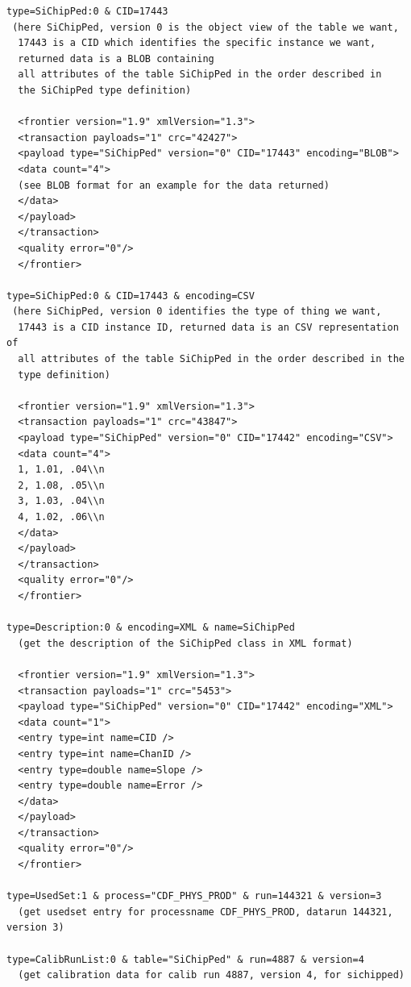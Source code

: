 \begin{verbatim}
type=SiChipPed:0 & CID=17443
 (here SiChipPed, version 0 is the object view of the table we want,
  17443 is a CID which identifies the specific instance we want,
  returned data is a BLOB containing
  all attributes of the table SiChipPed in the order described in 
  the SiChipPed type definition)

  <frontier version="1.9" xmlVersion="1.3">
  <transaction payloads="1" crc="42427">
  <payload type="SiChipPed" version="0" CID="17443" encoding="BLOB">
  <data count="4">
  (see BLOB format for an example for the data returned)
  </data>	
  </payload>
  </transaction>
  <quality error="0"/>
  </frontier>

type=SiChipPed:0 & CID=17443 & encoding=CSV
 (here SiChipPed, version 0 identifies the type of thing we want,
  17443 is a CID instance ID, returned data is an CSV representation of
  all attributes of the table SiChipPed in the order described in the 
  type definition)

  <frontier version="1.9" xmlVersion="1.3">
  <transaction payloads="1" crc="43847">
  <payload type="SiChipPed" version="0" CID="17442" encoding="CSV">
  <data count="4">
  1, 1.01, .04\\n
  2, 1.08, .05\\n
  3, 1.03, .04\\n
  4, 1.02, .06\\n
  </data>	
  </payload>
  </transaction>
  <quality error="0"/>
  </frontier>

type=Description:0 & encoding=XML & name=SiChipPed
  (get the description of the SiChipPed class in XML format)

  <frontier version="1.9" xmlVersion="1.3">
  <transaction payloads="1" crc="5453">
  <payload type="SiChipPed" version="0" CID="17442" encoding="XML">
  <data count="1">
  <entry type=int name=CID />
  <entry type=int name=ChanID />
  <entry type=double name=Slope />
  <entry type=double name=Error />
  </data>	
  </payload>
  </transaction>
  <quality error="0"/>
  </frontier>

type=UsedSet:1 & process="CDF_PHYS_PROD" & run=144321 & version=3
  (get usedset entry for processname CDF_PHYS_PROD, datarun 144321, version 3)

type=CalibRunList:0 & table="SiChipPed" & run=4887 & version=4
  (get calibration data for calib run 4887, version 4, for sichipped)

\end{verbatim}


